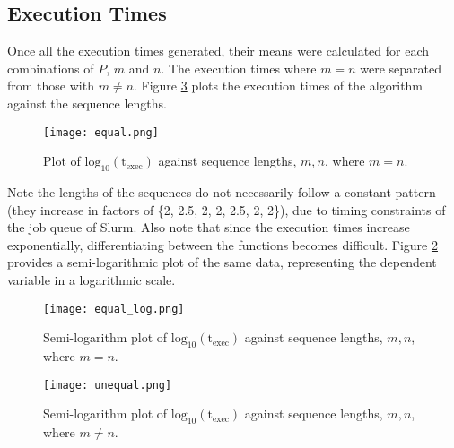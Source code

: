 \documentclass[usletter, 11pt]{extarticle}
\begin{document}
        \subsection{Execution Times} Once all the execution times generated,
        their means were calculated for each combinations of $P$, $m$ and $n$.
        The execution times where $m = n$ were separated from those with $m \ne
        n$. Figure \ref{equal} plots the execution times of the algorithm
        against the sequence lengths.

        \begin{figure}[ht]
            \begin{center}
                \texttt{[image: equal.png]}
                \caption{Plot of
                $\text{log}_{10}(\text{t}_{\text{exec}})$ against sequence
                lengths, $m,n$, where $m=n$.} \label{equal}
            \end{center}
        \end{figure}

        Note the lengths of the sequences do not necessarily follow a constant
        pattern (they increase in factors of \{2, 2.5, 2, 2, 2.5, 2, 2\}), due
        to timing constraints of the job queue of Slurm. Also note that since
        the execution times increase exponentially, differentiating between the
        functions becomes difficult. Figure \ref{equal_log} provides a semi-logarithmic plot of the same data, representing the dependent variable in a logarithmic scale.

        \begin{figure}[ht]
            \begin{center}
                \texttt{[image: equal\_log.png]}
                \caption{Semi-logarithm plot of
                $\text{log}_{10}(\text{t}_{\text{exec}})$ against sequence
                lengths, $m,n$, where $m=n$.} \label{equal_log}
            \end{center}
        \end{figure}
        \begin{figure}[ht]
            \begin{center}
                \texttt{[image: unequal.png]}
                \caption{Semi-logarithm plot of
                $\text{log}_{10}(\text{t}_{\text{exec}})$ against sequence
                lengths, $m,n$, where $m\ne n$. } \label{equal}
            \end{center}
        \end{figure}
\end{document}
